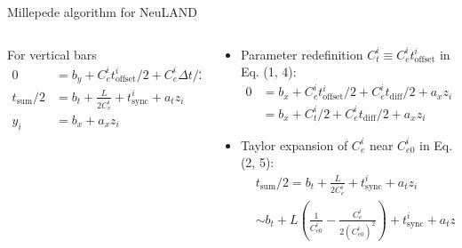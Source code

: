 \documentclass{ikpKoeln}
\newcommand{\espeed}{C^i_e}
\newcommand{\espeedi}{C^i_{e0}}
\newcommand{\tspeed}{C^i_t}
\newcommand{\tsync}{t^i_{\text{sync}}}
\newcommand{\toff}{t^i_{\text{offset}}}
\begin{document}
\begin{frame}{Millepede algorithm for NeuLAND}
\begin{columns}[t]
\begin{column}{0.5 \textwidth}
{\begin{block}{For vertical bars}
\begin{align}
						0              & = b_y + \espeed \toff/ 2 + \espeed \Delta t /2 + a_y z_i \\
						t_\text{sum}/2 & =b_t + \frac{L}{2 \espeed}  + \tsync + a_t z_i           \\
						y_i            & = b_x + a_x z_i
					\end{align}
				\end{block}
			}
		\end{column}
		\begin{column}{0.45 \textwidth}
			\onslide<2>
			\begin{itemize}
				\item {\scriptsize Parameter redefinition $\tspeed \equiv \espeed \toff$ in Eq. (1, 4):}
				      \vspace*{-0.5em}
				      \begin{align*}
					      0 & = b_x + \espeed \toff/ 2 + \espeed t_\text{diff}/2 + a_x z_i \\
					        & = b_x + \tspeed/ 2 + \espeed t_\text{diff}/2 + a_x z_i
				      \end{align*}
				\item {\scriptsize Taylor expansion of $\espeed$ near $\espeedi$ in Eq. (2, 5):}
				      \vspace*{-0.5em}
				      \begin{align*}
					       & t_\text{sum}/2  =b_t + \frac{L}{2 \espeed}  + \tsync + a_t z_i                                     \\
					       & \sim b_t + L \left( \frac{1}{\espeedi} - \frac{\espeed}{2(\espeedi)^2} \right)  + \tsync + a_t z_i
				      \end{align*}
			\end{itemize}
		\end{column}
	\end{columns}
\end{frame}
\end{document}
